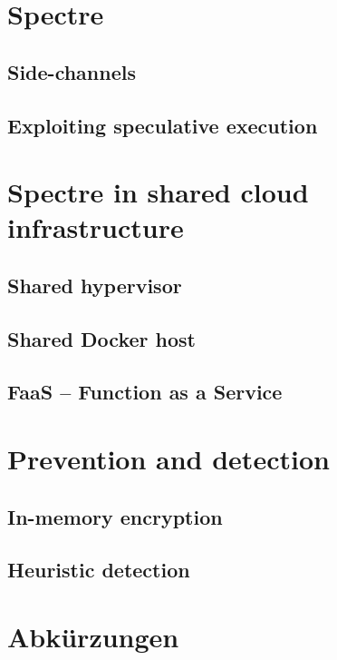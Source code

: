 \documentclass[conference,compsoc,final,a4paper]{IEEEtran}
\begin{document}
\section{Spectre}

\subsection{Side-channels}

\subsection{Exploiting speculative execution}

\section{Spectre in shared cloud infrastructure}

\subsection{Shared hypervisor}

\subsection{Shared Docker host}

\subsection{FaaS -- Function as a Service}

\section{Prevention and detection}
\subsection{In-memory encryption}
\subsection{Heuristic detection}

\section*{Abkürzungen}

\begin{acronym}[IEEE]
\end{acronym}

\printbibliography
\end{document}
